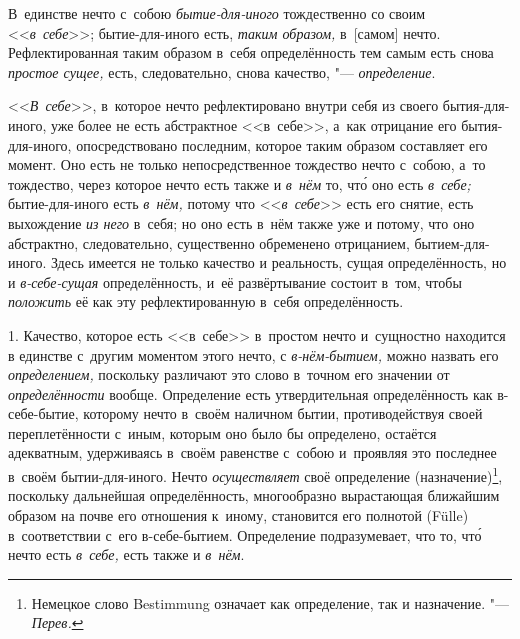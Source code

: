 В~единстве нечто с~собою {\em бытие-для-иного}
тождественно со своим <<{\em в~себе}>>; бытие-для-иного
есть, {\em таким образом,} в~[самом] нечто.
Рефлектированная таким образом в~себя определённость тем самым есть снова
{\em простое сущее,} есть, следовательно, снова
качество, "--- {\em определение}.


<<{\em В~себе}>>, в~которое нечто рефлектировано внутри
себя из своего бытия-для-иного, уже более не есть абстрактное <<в~себе>>,
а~как отрицание его бытия-для-иного, опосредствовано последним, которое
таким образом составляет его момент. Оно есть не только непосредственное
тождество нечто с~собою, а~то тождество, через которое нечто есть также и
{\em в~нём} то, чт\'{о} оно есть {\em в~себе;}
бытие-для-иного есть {\em в~нём,} потому что
<<{\em в~себе}>> есть его снятие, есть выхождение
{\em из него} в~себя; но оно есть в~нём также уже и
потому, что оно абстрактно, следовательно, существенно обременено
отрицанием, бытием-для-иного. Здесь имеется не только качество и
реальность, сущая определённость, но и
{\em в-себе-сущая} определённость, и~её развёртывание
состоит в~том, чтобы {\em положить} её как эту
рефлектированную в~себя определённость.

1. Качество, которое есть <<в~себе>> в~простом нечто и~сущностно находится в
единстве с~другим моментом этого нечто, с {\em в-нём-бытием,} можно назвать его
{\em определением,} поскольку различают это слово в~точном его значении от
{\em определённости} вообще. Определение есть утвердительная определённость как
в-себе-бытие, которому нечто в~своём наличном бытии, противодействуя своей
переплетённости с~иным, которым оно было бы определено, остаётся адекватным,
удерживаясь в~своём равенстве с~собою и~проявляя это последнее в~своём
бытии-для-иного. Нечто {\em осуществляет} своё определение
(назначение)\footnote{Немецкое слово Bestimmung означает как определение, так и
назначение. "--- {\em Перев.}}, поскольку дальнейшая определённость,
многообразно вырастающая ближайшим образом на почве его отношения к~иному,
становится его полнотой (Fülle) в~соответствии с~его в-себе-бытием. Определение
подразумевает, что то, чт\'{о} нечто есть {\em в~себе,} есть также и
{\em в~нём}.

